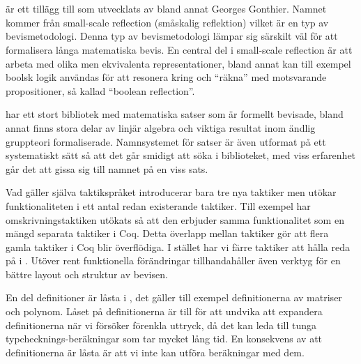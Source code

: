 \section{\ssr{}}
\label{sec:ssr}
\ssr{} är ett tillägg till \coq{} som utvecklats av bland annat Georges
Gonthier. Namnet kommer från small-scale reflection (småskalig reflektion)
vilket är en typ av bevismetodologi. Denna typ av bevismetodologi lämpar sig
särskilt väl för att formalisera långa matematiska bevis. En central del i
small-scale reflection är att arbeta med olika men ekvivalenta
representationer, bland annat kan till exempel boolsk logik användas för att
resonera kring och ``räkna'' med motsvarande propositioner, så kallad ``boolean
reflection''.

\ssr{} har ett stort bibliotek med matematiska satser som är formellt bevisade,
bland annat finns stora delar av linjär algebra och viktiga resultat inom
ändlig gruppteori formaliserade. Namnsystemet för satser är även utformat på
ett systematiskt sätt så att det går smidigt att söka i biblioteket, med viss
erfarenhet går det att gissa sig till namnet på en viss sats.

Vad gäller själva taktikspråket introducerar \ssr{} bara tre nya taktiker men
utökar funktionaliteten i ett antal redan existerande taktiker. Till exempel
har omskrivningstaktiken  utökats så att den erbjuder samma
funktionalitet som en mängd separata taktiker i Coq. Detta överlapp mellan
taktiker gör att flera gamla taktiker i Coq blir överflödiga. I stället har
vi färre taktiker att hålla reda på i \ssr{}. Utöver rent funktionella
förändringar tillhandahåller \ssr{} även verktyg för en bättre layout och
struktur av bevisen.

En del definitioner är låsta i \ssr{}, det gäller till exempel definitionerna
av matriser och polynom. Låset på definitionerna är till för att undvika att
expandera definitionerna när vi försöker förenkla uttryck, då det kan leda till
tunga typchecknings-beräkningar som tar mycket lång tid. En konsekvens av att
definitionerna är låsta är att vi inte kan utföra beräkningar med dem.
